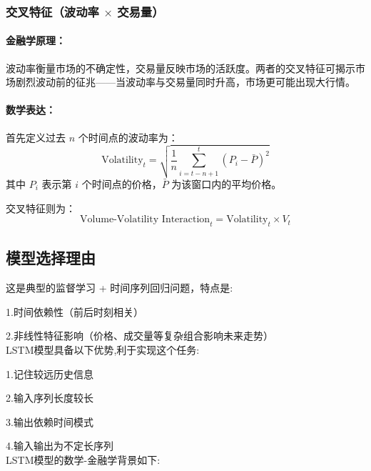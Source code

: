 \documentclass[a4paper,12pt]{ctexart}
\begin{document}
\subsubsection{交叉特征（波动率 $\times$ 交易量）}

\paragraph{金融学原理：}

波动率衡量市场的不确定性，交易量反映市场的活跃度。两者的交叉特征可揭示市场剧烈波动前的征兆——当波动率与交易量同时升高，市场更可能出现大行情。

\paragraph{数学表达：}

首先定义过去 $n$ 个时间点的波动率为：
\[
\text{Volatility}_t = \sqrt{\frac{1}{n} \sum_{i=t-n+1}^{t} (P_i - \bar{P})^2}
\]
其中 $P_i$ 表示第 $i$ 个时间点的价格，$\bar{P}$ 为该窗口内的平均价格。

交叉特征则为：
\[
\text{Volume-Volatility Interaction}_t = \text{Volatility}_t \times V_t
\]

\newpage
\subsection{模型选择理由}

这是典型的监督学习 + 时间序列回归问题，特点是:

1.时间依赖性（前后时刻相关）

2.非线性特征影响（价格、成交量等复杂组合影响未来走势）\\

LSTM模型具备以下优势,利于实现这个任务:

1.记住较远历史信息

2.输入序列长度较长

3.输出依赖时间模式

4.输入输出为不定长序列\\

LSTM模型的数学-金融学背景如下:
\end{document}
